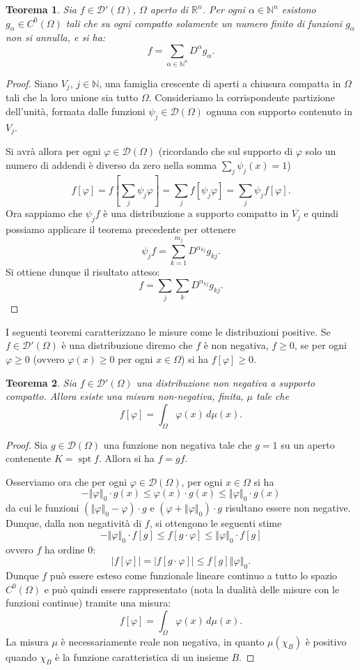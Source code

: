 \documentclass[italian,a4paper,oneside,headinclude]{scrbook}
\renewcommand{\phi}{\varphi}
\newcommand{\D}{\mathcal D}
\newcommand{\NN}{\mathbb N}
\newcommand{\RR}{\mathbb R}
\newcommand{\abs}[1]{{\left|#1\right|}}
\newcommand{\Abs}[1]{{\left\Vert #1\right\Vert}}
\DeclareMathOperator{\spt}{spt}
\newtheorem{theorem}{Teorema}
\begin{document}
\begin{theorem}
  Sia $f\in \D'(\Omega)$, $\Omega$ aperto di $\RR^n$.
  Per ogni $\alpha \in \NN^n$ esistono
  $g_\alpha\in C^0(\Omega)$ tali che su ogni compatto solamente un
  numero finito di funzioni $g_\alpha$ non si annulla, e si ha:
  \[
    f = \sum_{\alpha\in \NN^n} D^\alpha g_\alpha.
  \]
\end{theorem}
%
\begin{proof}
  Siano $V_j$, $j\in\NN$, una famiglia crescente di aperti a chiusura
  compatta in $\Omega$ tali che la loro unione sia tutto
  $\Omega$. Consideriamo la corrispondente
  partizione dell'unità, formata dalle funzioni $\psi_j\in \D(\Omega)$
  ognuna con supporto contenuto in $V_j$.

  Si avrà allora per ogni $\phi\in\D(\Omega)$ (ricordando che sul
  supporto di $\phi$ solo un numero di addendi è diverso da zero nella
  somma $\sum_j \psi_j(x) = 1$)
  \[
  f[\phi] = f[\sum_j \psi_j \phi] = \sum_j f[\psi_j \phi] = \sum_j
  \psi_j f[\phi].
  \]
  Ora sappiamo che $\psi_j f$ è una distribuzione a supporto compatto
  in $\overline{V_j}$ e quindi possiamo applicare il teorema
  precedente per ottenere
  \[
  \psi_j f = \sum_{k=1}^{m_j} D^{\alpha_{kj}} g_{kj}.
  \]
  Si ottiene dunque il risultato atteso:
  \[
  f = \sum_j \sum_k D^{\alpha_{kj}} g_{kj}.
  \]
\end{proof}

I seguenti teoremi caratterizzano le misure come le distribuzioni
positive.
Se $f\in\D'(\Omega)$ è una distribuzione diremo che $f$ è non negativa,
$f\ge 0$, se per ogni $\phi\ge 0$ (ovvero $\phi(x)\ge 0$ per ogni $x
\in \Omega$) si ha $f[\phi]\ge 0$.

\begin{theorem}
Sia $f\in \D'(\Omega)$ una distribuzione non negativa a supporto
compatto. Allora esiste una misura non-negativa, finita, $\mu$ tale
che
\[
  f[\phi] = \int_\Omega \phi(x)\, d\mu(x).
\]
\end{theorem}
%
\begin{proof}
  Sia $g\in \D(\Omega)$ una funzione non negativa tale che $g=1$ su un
  aperto contenente $K=\spt f$. Allora si ha $f=gf$.

  Osserviamo ora che per ogni $\phi\in \D(\Omega)$, per ogni $x\in \Omega$ si ha
  \[
  -\Abs{\phi}_0 \cdot g(x)  \le \phi(x) \cdot g(x) \le \Abs{\phi}_0
  \cdot g(x)
  \]
  da cui le funzioni $(\Abs{\phi}_0 - \phi)\cdot g$ e
  $(\phi+\Abs{\phi}_0)\cdot g $
  risultano essere non negative. Dunque, dalla non negatività di $f$,
  si ottengono le seguenti stime
  \[
  - \Abs{\phi}_0 \cdot f[g]\le f[g\cdot \phi] \le \Abs{\phi}_0 \cdot f[g]
  \]
  ovvero $f$ ha ordine $0$:
  \[
  \abs{f[\phi]} = \abs{f[g\cdot \phi]} \le f[g] \Abs{\phi}_0.
  \]
  Dunque $f$ può essere esteso come funzionale lineare continuo a
  tutto lo spazio $C^0(\Omega)$ e può quindi essere rappresentato
  (nota la dualità delle misure con le funzioni continue)
  tramite una misura:
  \[
  f[\phi] = \int_\Omega \phi(x)\, d\mu(x).
  \]
  La misura $\mu$ è necessariamente reale non negativa, in quanto
  $\mu(\chi_B)$ è positivo quando $\chi_B$ è la funzione
  caratteristica di un insieme $B$.
\end{proof}
\end{document}
